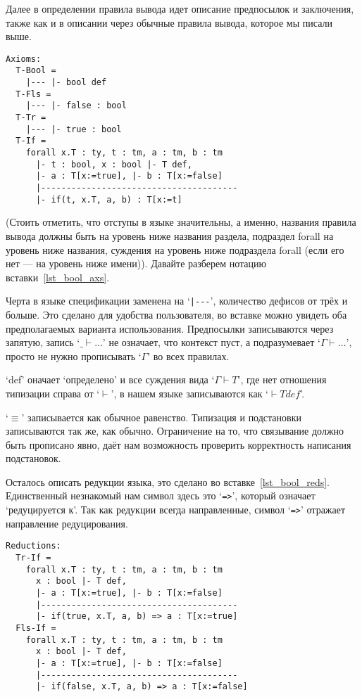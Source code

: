 Далее в определении правила вывода идет описание предпосылок и заключения, также как и в описании через обычные правила вывода, которое мы писали выше.

\begin{lstlisting}[label={lst_bool_axs}, caption={Правила вывода языка Bool, описанные в языке спецификации},captionpos=b, frame=single, float]
Axioms:
  T-Bool =
    |--- |- bool def
  T-Fls =
    |--- |- false : bool
  T-Tr =
    |--- |- true : bool
  T-If =
    forall x.T : ty, t : tm, a : tm, b : tm
      |- t : bool, x : bool |- T def,
      |- a : T[x:=true], |- b : T[x:=false]
      |---------------------------------------
      |- if(t, x.T, a, b) : T[x:=t]
\end{lstlisting}

(Стоить отметить, что отступы в языке значительны, а именно, названия правила вывода должны быть на уровень ниже названия раздела, подраздел forall на уровень ниже названия, суждения на уровень ниже подраздела forall (если его нет --- на уровень ниже имени)). Давайте разберем нотацию вставки~\ref{lst_bool_axs}.

Черта в языке спецификации заменена на `\lstinline{|---}', количество дефисов от трёх и больше. Это сделано для удобства пользователя, во вставке можно увидеть оба предполагаемых варианта использования. Предпосылки записываются через запятую, запись `$\_ \vdash ... $' не означает, что контекст пуст, а подразумевает `$\Gamma \vdash ... $', просто не нужно прописывать `$\Gamma$' во всех правилах.

`def' оначает `определено' и все суждения вида `$\Gamma \vdash T$', где нет отношения типизации справа от `$\vdash$', в нашем языке записываются как `$ \vdash T def$'.

`$\equiv$' записывается как обычное равенство. Типизация и подстановки записываются так же, как обычно. Ограничение на то, что связывание должно быть прописано явно, даёт нам возможность проверить корректность написания подстановок.

Осталось описать редукции языка, это сделано во вставке~\ref{lst_bool_reds}. Единственный незнакомый нам символ здесь это `\lstinline{=>}', который означает `редуцируется к'. Так как редукции всегда направленные, символ `\lstinline{=>}' отражает направление редуцирования.

\begin{lstlisting}[label={lst_bool_reds}, caption={Редукции языка Bool, описанные в языке спецификации},captionpos=b, frame=single, float]
Reductions:
  Tr-If =
    forall x.T : ty, t : tm, a : tm, b : tm
      x : bool |- T def,
      |- a : T[x:=true], |- b : T[x:=false]
      |---------------------------------------
      |- if(true, x.T, a, b) => a : T[x:=true]
  Fls-If =
    forall x.T : ty, t : tm, a : tm, b : tm
      x : bool |- T def,
      |- a : T[x:=true], |- b : T[x:=false]
      |---------------------------------------
      |- if(false, x.T, a, b) => a : T[x:=false]
\end{lstlisting}

